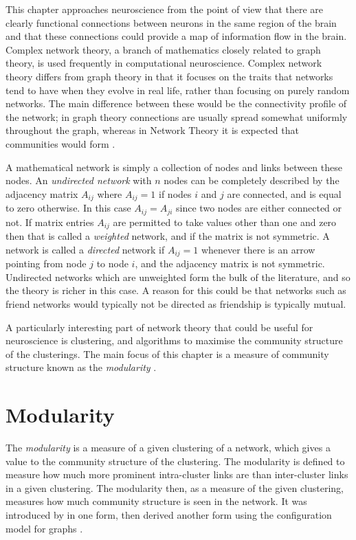 
This chapter approaches neuroscience from the point of view that there are
clearly functional connections between neurons in the same region of the brain and
that these connections could provide a map of information flow in the brain.  Complex network theory, a branch 
of mathematics closely related to graph theory, is used frequently in computational neuroscience. Complex network theory differs from 
graph theory in that it focuses on the traits that networks tend to have when they evolve in real life, rather than focusing on purely random networks.  
The main difference between these would be the connectivity profile of the 
network; in graph theory connections are usually spread somewhat uniformly 
throughout the graph, whereas in Network Theory it is  expected that communities would form \citep{Newman2010a}.

A mathematical network is simply a collection of nodes and links between
these nodes.  An \emph{undirected network} with $n$ nodes can be
completely described by the adjacency matrix $A_{ij}$ where $A_{ij} =
1$ if nodes $i$ and $j$ are connected, and is equal to zero otherwise. In this 
case $A_{ij} = A_{ji}$ since two nodes are either connected or
not.  If matrix entries $A_{ij}$ are permitted to take values other than one and zero
then that is called a \emph{weighted} network, and if the matrix is not symmetric. A network is called a \emph{directed} network if $A_{ij} = 1$ whenever there 
is an arrow pointing from node $j$ to node $i$, and the adjacency matrix is not symmetric.   Undirected networks which are unweighted form the bulk of the literature, and so the theory is richer
in this case. A reason for this could be that networks such as friend networks \citep{Zachary1977a} would typically not be directed as friendship is typically mutual.

A particularly interesting part of network theory that could be useful for
neuroscience is clustering, and algorithms to maximise the community structure of the clusterings.  The main focus of this chapter is a measure of community structure known as the
\emph{modularity} \citep{NewmanGirvan2004a}.

\section{Modularity}

The \emph{modularity} is a measure of a given clustering of a network, which gives a value to the community structure of the clustering. The modularity is defined to measure how much more prominent
intra-cluster links are than inter-cluster links in a given
clustering. The modularity then, as a measure of the given clustering, measures how much community structure is seen in the network.  It was introduced by \citet{NewmanGirvan2004a} in one form, then \citet{Newman2006b, Newman2006a} derived another form using the configuration model for graphs \citep{BenderCanfield1978a,Bollobas1980a}.


